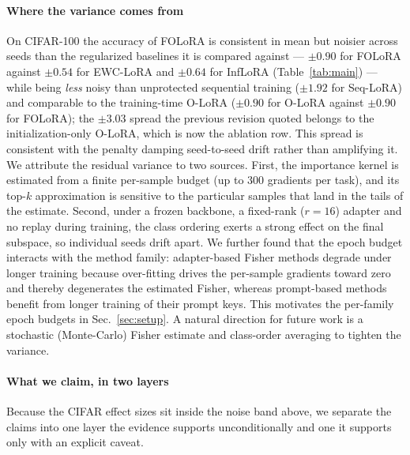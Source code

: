 \paragraph{Where the variance comes from}
On CIFAR-100 the accuracy of FOLoRA is consistent in mean but noisier across seeds than
the regularized baselines it is compared against --- $\pm0.90$ for FOLoRA against $\pm0.54$
for EWC-LoRA and $\pm0.64$ for InfLoRA (Table~\ref{tab:main}) --- while being
\emph{less} noisy than unprotected sequential training ($\pm1.92$ for Seq-LoRA) and
comparable to the training-time O-LoRA ($\pm0.90$ for O-LoRA against $\pm0.90$ for FOLoRA);
the $\pm3.03$ spread the previous revision quoted belongs to the initialization-only O-LoRA,
which is now the ablation row. This spread is consistent with the penalty damping
seed-to-seed drift rather than amplifying it. We attribute the residual
variance to two sources. First, the importance kernel is estimated
from a finite per-sample budget (up to 300 gradients per task), and its top-$k$
approximation is sensitive to the particular samples that land in the tails of the
estimate. Second, under a frozen backbone, a fixed-rank ($r{=}16$) adapter and no replay during training,
the class ordering exerts a strong effect on the final subspace, so individual seeds drift
apart. We further found that the epoch budget interacts with the method family:
adapter-based Fisher methods degrade under longer training because over-fitting drives the
per-sample gradients toward zero and thereby degenerates the estimated Fisher, whereas
prompt-based methods benefit from longer training of their prompt keys. This motivates the
per-family epoch budgets in Sec.~\ref{sec:setup}. A natural direction for future work is a
stochastic (Monte-Carlo) Fisher estimate and class-order averaging to tighten the
variance.

\paragraph{What we claim, in two layers}
Because the CIFAR effect sizes sit inside the noise band above, we separate the claims into
one layer the evidence supports unconditionally and one it supports only with an explicit
caveat.

